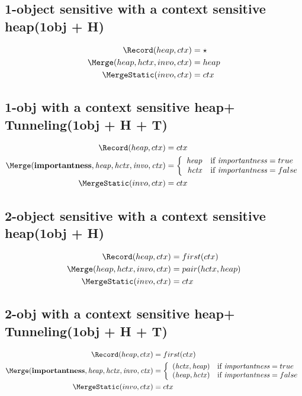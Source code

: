 \subsection{1-object sensitive with a context sensitive heap(1obj + H)}

\begin{align*}
	\Record (heap, ctx) &=\star\\
	\Merge (heap, hctx, invo, ctx)&= heap\\
	\MergeStatic (invo, ctx)&=ctx\\
\end{align*}

\subsection{1-obj with a context sensitive heap+ Tunneling(1obj + H + T)}
\begin{align*}
\Record (heap, ctx) &= ctx\\
\Merge ({\it \textbf{importantness}, heap, hctx, invo, ctx}) &= \left\{
 \begin{array}{rl}
{\it heap} & \mbox{if}~{\it importantness} = true \\
{\it hctx} & \mbox{if}~{\it importantness}=false
\end{array}
\right.\\
\MergeStatic (invo, ctx)&=ctx\\
\end{align*}

\subsection{2-object sensitive with a context sensitive heap(1obj + H)}

\begin{align*}
	\Record (heap, ctx) &=first(ctx)\\
	\Merge (heap, hctx, invo, ctx)&= pair(hctx, heap)\\
	\MergeStatic (invo, ctx)&=ctx\\
\end{align*}

\subsection{2-obj with a context sensitive heap+ Tunneling(1obj + H + T)}
\begin{align*}
\Record (heap, ctx) &= first(ctx)\\
\Merge ({\it \textbf{importantness}, heap, hctx, invo, ctx}) &= \left\{
 \begin{array}{rl}
{\it (hctx,heap)} & \mbox{if}~{\it importantness} = true \\
{\it (heap,hctx)} & \mbox{if}~{\it importantness}=false
\end{array}
\right.\\
\MergeStatic (invo, ctx)&=ctx\\
\end{align*}
